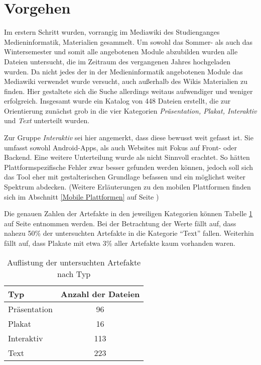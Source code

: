 
\section{Vorgehen}
Im erstern Schritt wurden, vorrangig im Mediawiki des Studienganges Medieninformatik, Materialien gesammelt. Um sowohl das Sommer- als auch das Wintersemester und somit alle angebotenen Module abzubilden wurden alle Dateien untersucht, die im Zeitraum des vergangenen Jahres hochgeladen wurden.
Da nicht jedes der in der Medieninformatik angebotenen Module das Mediawiki verwendet wurde versucht, auch außerhalb des Wikis Materialien zu finden. Hier gestaltete sich die Suche allerdings weitaus aufwendiger und weniger erfolgreich.
Insgesamt wurde ein Katalog von 448 Dateien erstellt, die zur Orientierung zunächst grob in die vier Kategorien \textit{Präsentation, Plakat, Interaktiv} und \textit{Text} unterteilt wurden.

Zur Gruppe \textit{Interaktiv} sei hier angemerkt, dass diese bewusst weit gefasst ist. Sie umfasst sowohl Android-Apps, als auch Websites mit Fokus auf Front- oder Backend.
Eine weitere Unterteilung wurde als nicht Sinnvoll erachtet. So hätten Plattformspezifische Fehler zwar besser gefunden werden können, jedoch soll sich das Tool eher mit gestalterischen Grundlage befassen und ein möglichst weiter Spektrum abdecken. (Weitere Erläuterungen zu den mobilen Plattformen finden sich im Abschnitt \ref{Mobile Plattformen} auf Seite \pageref{Mobile Plattformen})

Die genauen Zahlen der Artefakte in den jeweiligen Kategorien können Tabelle \ref{table:types} auf Seite \pageref{table:types} entnommen werden. Bei der Betrachtung der Werte fällt auf, dass nahezu 50\% der untersuchten Artefakte in die Kategorie “Text” fallen. Weiterhin fällt auf, dass Plakate mit etwa 3\% aller Artefakte kaum vorhanden waren.

\begin{table}[]
\centering
\begin{tabular}{|l|c|}
\hline
\textbf{Typ} & \multicolumn{1}{l|}{\textbf{Anzahl der Dateien}} \\ \hline
Präsentation & 96                                               \\ \hline
Plakat       & 16                                               \\ \hline
Interaktiv   & 113                                              \\ \hline
Text         & 223                                              \\ \hline
\end{tabular}
\caption{Auflistung der untersuchten Artefakte nach Typ}
\label{table:types}
\end{table}

